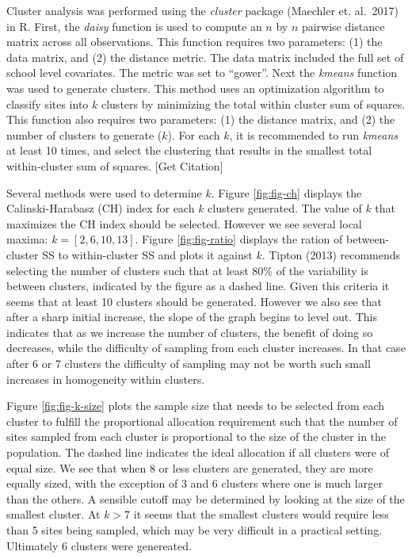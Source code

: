 \documentclass[man,floatsintext]{apa6}
\begin{document}
Cluster analysis was performed using the \emph{cluster} package (Maechler et. al.~2017) in R. First, the \emph{daisy} function is used to compute an \(n\) by \(n\) pairwise distance matrix across all observations. This function requires two parameters: (1) the data matrix, and (2) the distance metric. The data matrix included the full set of school level covariates. The metric was set to \enquote{gower}. Next the \emph{kmeans} function was used to generate clusters. This method uses an optimization algorithm to classify sites into \(k\) clusters by minimizing the total within cluster sum of squares. This function also requires two parameters: (1) the distance matrix, and (2) the number of clusters to generate (\(k\)). For each \(k\), it is recommended to run \emph{kmeans} at least 10 times, and select the clustering that results in the smallest total within-cluster sum of squares. {[}Get Citation{]}

Several methods were used to determine \(k\). Figure \ref{fig:fig-ch} displays the Calinski-Harabasz (CH) index for each \(k\) clusters generated. The value of \(k\) that maximizes the CH index should be selected. However we see several local maxima: \(k = [2, 6, 10, 13]\). Figure \ref{fig:fig-ratio} displays the ration of between-cluster SS to within-cluster SS and plots it against \(k\). Tipton (2013) recommends selecting the number of clusters such that at least 80\% of the variability is between clusters, indicated by the figure as a dashed line. Given this criteria it seems that at least 10 clusters should be generated. However we also see that after a sharp initial increase, the slope of the graph begins to level out. This indicates that as we increase the number of clusters, the benefit of doing so decreases, while the difficulty of sampling from each cluster increases. In that case after 6 or 7 clusters the difficulty of sampling may not be worth such small increases in homogeneity within clusters.

Figure \ref{fig:fig-k-size} plots the sample size that needs to be selected from each cluster to fulfill the proportional allocation requirement such that the number of sites sampled from each cluster is proportional to the size of the cluster in the population. The dashed line indicates the ideal allocation if all clusters were of equal size. We see that when 8 or less clusters are generated, they are more equally sized, with the exception of 3 and 6 clusters where one is much larger than the others. A sensible cutoff may be determined by looking at the size of the smallest cluster. At \(k > 7\) it seems that the smallest clusters would require less than 5 sites being sampled, which may be very difficult in a practical setting. Ultimately 6 clusters were genereated.
\end{document}
